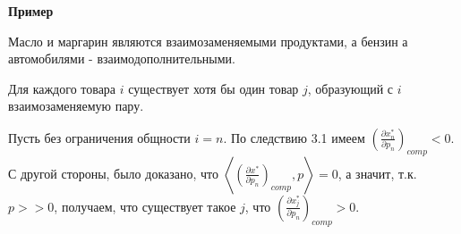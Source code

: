 \textbf{Пример}

Масло и маргарин являются взаимозаменяемыми продуктами, а бензин а автомобилями - взаимодополнительными.

\begin{conseq}[]\label{cha:3/conseq:4}
	Для каждого товара $i$ существует хотя бы один товар $j$, образующий с $i$ взаимозаменяемую пару.
\end{conseq}
\begin{Proof}
	Пусть без ограничения общности $i = n$. По следствию 3.1 имеем $\left(\frac{\partial x_n^{*}}{\partial p_n}\right)_{comp} < 0$. С другой стороны, было доказано, что $\left< \left(\frac{\partial x^{*}}{\partial p_n}\right)_{comp}, p \right> = 0$, а значит, т.к. $p >> 0$, получаем, что существует такое $j$, что $\left(\frac{\partial x_j^{*}}{\partial p_n}\right)_{comp} > 0$.
\end{Proof}
















